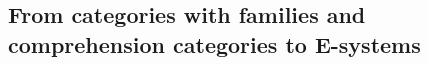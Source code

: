\begin{comment}
In the following definition $\Delta(X)$ denotes the discrete category on the set
$X$ and $\mathbf{2}$ is the category $s\to t$.
\begin{defn}
Define $\mathbb{S}$ to be the pushout
\begin{equation*}
\begin{tikzcd}[column sep=large]
\Delta(\mathbb{N}) \arrow[r,"{n\mapsto(n,s)}"] \arrow[d,swap,"i"] & \Delta(\mathbb{N})\times\mathbf{2} \arrow[d] \\
(\mathbb{N},\leq) \arrow[r] & \mathbb{S}
\end{tikzcd}
\end{equation*}
in $\mathbf{Cat}$.
\end{defn}

Note that for any $n\in\mathbb{N}$, we have the map $S^n := (m\mapsto m+n)$ which
is monotone. By the universal property of pushouts, we obtain a functor $\sigma^n:\mathbb{S}\to\mathbb{S}$
given by
\begin{equation*}
\begin{tikzcd}[column sep=huge]
\Delta(\mathbb{N}) 
  \arrow[r,"{n\mapsto(n,s)}"] 
  \arrow[d,swap,"i"] 
  & 
\Delta(\mathbb{N})\times\mathbf{2} 
  \arrow[d]
  \arrow[r,"{\Delta(S^n)\times\catid{\mathbf{2}}}"]
  &
\Delta(\mathbb{N})\times\mathbf{2}
  \arrow[dd]
  \\
(\mathbb{N},\leq) 
  \arrow[r] 
  \arrow[d,swap,"{(S^n,\leq)}"]
  & 
\mathbb{S}
  \arrow[dr,densely dotted,yshift=.5ex,"\sigma^n"]
  \\
(\mathbb{N},\leq)
  \arrow[rr] & &
\mathbb{S}
\end{tikzcd}
\end{equation*}

\begin{defn}
A non-unital pre-B0-system is a presheaf $B$ on $\mathbb{S}$ such that $B(0)$ is
a singleton, and the following additional structure:
\begin{enumerate}
\item For any $n\in\mathbb{N}$ and $X\in B(n)$, write $B/X$ for the sub-presheaf
of $B\circ\sigma^n$ given by $B/X(0)=\{X\}$ and $B/X(n+1)=B_{n\leq n+1}^{-1}(B/X(n))$. 
We require that for any $n\in\mathbb{N}$ and any $A\in B(n+1)$, there is a 
natural transformation $W_A:B/(B_{n\leq n+1}(A))\Rightarrow B/A$.
\end{enumerate}
\end{defn}
\end{comment}

\subsection{From categories with families and comprehension categories to E-systems}

